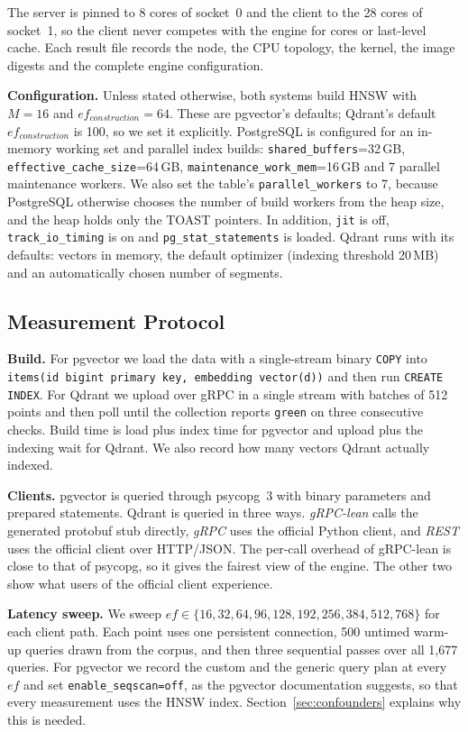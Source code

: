 \documentclass[sigconf, nonacm]{acmart}
\begin{document}
The server is pinned to 8 cores of socket~0 and the client to the 28 cores of socket~1,
so the client never competes with the engine for cores or last-level cache. Each result
file records the node, the CPU topology, the kernel, the image digests and the complete
engine configuration.

\textbf{Configuration.} Unless stated otherwise, both systems build HNSW with $M=16$ and
$ef_{construction}=64$. These are pgvector's defaults; Qdrant's default
$ef_{construction}$ is 100, so we set it explicitly. PostgreSQL is configured for an
in-memory working set and parallel index builds: \texttt{shared\_buffers}=32\,GB,
\texttt{effective\_cache\_size}=64\,GB, \texttt{maintenance\_work\_mem}=16\,GB and
7 parallel maintenance workers. We also set the table's \texttt{parallel\_workers} to 7,
because PostgreSQL otherwise chooses the number of build workers from the heap size, and
the heap holds only the TOAST pointers. In addition, \texttt{jit} is off,
\texttt{track\_io\_timing} is on and \texttt{pg\_stat\_statements} is loaded. Qdrant runs
with its defaults: vectors in memory, the default optimizer (indexing threshold 20\,MB)
and an automatically chosen number of segments.

\subsection{Measurement Protocol}
\label{sec:protocol}

\textbf{Build.} For pgvector we load the data with a single-stream binary \texttt{COPY}
into \texttt{items(id bigint primary key, embedding vector(d))} and then run
\texttt{CREATE INDEX}. For Qdrant we upload over gRPC in a single stream with batches of
512 points and then poll until the collection reports \texttt{green} on three
consecutive checks. Build time is load plus index time for pgvector and upload plus the
indexing wait for Qdrant. We also record how many vectors Qdrant actually indexed.

\textbf{Clients.} pgvector is queried through psycopg~3 with binary parameters and
prepared statements. Qdrant is queried in three ways. \emph{gRPC-lean} calls the
generated protobuf stub directly, \emph{gRPC} uses the official Python client, and
\emph{REST} uses the official client over HTTP/JSON. The per-call overhead of gRPC-lean
is close to that of psycopg, so it gives the fairest view of the engine. The other two
show what users of the official client experience.

\textbf{Latency sweep.} We sweep $ef\in\{16,32,64,96,128,192,256,384,512,768\}$ for
each client path. Each point uses one persistent connection, 500 untimed warm-up queries
drawn from the corpus, and then three sequential passes over all 1{,}677 queries. For
pgvector we record the custom and the generic query plan at every $ef$ and set
\texttt{enable\_seqscan=off}, as the pgvector documentation suggests, so that every
measurement uses the HNSW index. Section~\ref{sec:confounders} explains why this is
needed.
\end{document}
